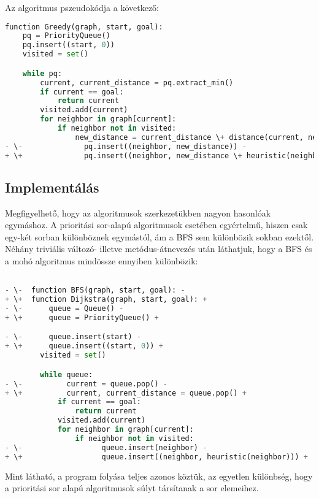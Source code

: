 Az algoritmus pszeudokódja a következő:

\begin{lstlisting}[language={Python}, style=gitdiff]
function Greedy(graph, start, goal):
    pq = PriorityQueue()
    pq.insert((start, 0))
    visited = set()

    while pq:
        current, current_distance = pq.extract_min()
        if current == goal:
            return current
        visited.add(current)
        for neighbor in graph[current]:
            if neighbor not in visited:
                new_distance = current_distance \+ distance(current, neighbor)
- \-              pq.insert((neighbor, new_distance)) -
+ \+              pq.insert((neighbor, new_distance \+ heuristic(neighbor))) +
\end{lstlisting}

\subsection{Implementálás}

Megfigyelhető, hogy az algoritmusok szerkezetükben nagyon hasonlóak egymáshoz. A prioritási sor-alapú algoritmusok esetében egyértelmű, hiszen csak egy-két sorban különböznek egymástól, ám a BFS sem különbözik sokban ezektől. Néhány triviális változó- illetve metódus-átnevezés után láthatjuk, hogy a BFS és a mohó algoritmus mindössze ennyiben különbözik:

\begin{lstlisting}[language={Python}, style=gitdiff]

- \-  function BFS(graph, start, goal): -
+ \+  function Dijkstra(graph, start, goal): +
- \-      queue = Queue() -
+ \+      queue = PriorityQueue() +

- \-      queue.insert(start) -
+ \+      queue.insert((start, 0)) +
        visited = set()

        while queue:
- \-          current = queue.pop() -
+ \+          current, current_distance = queue.pop() +
            if current == goal:
                return current
            visited.add(current)
            for neighbor in graph[current]:
                if neighbor not in visited:
- \-                  queue.insert(neighbor) -
+ \+                  queue.insert((neighbor, heuristic(neighbor))) +
\end{lstlisting}

Mint látható, a program folyása teljes azonos köztük, az egyetlen különbség, hogy a prioritási sor alapú algoritmusok súlyt társítanak a sor elemeihez.
